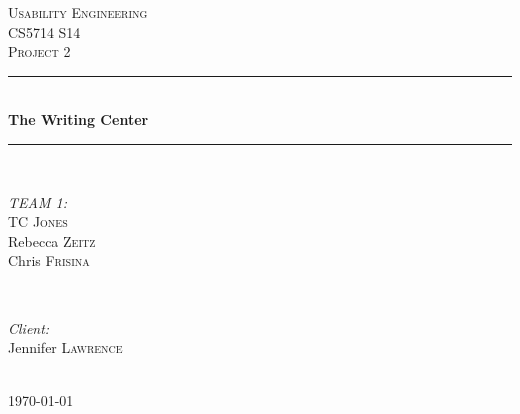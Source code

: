 \documentclass[12pt]{article} %
\begin{document}

\begin{titlepage}

\newcommand{\HRule}{\rule{\linewidth}{0.5mm}} %

\center %

\textsc{\LARGE Usability Engineering}\\[1.5cm] %
\textsc{\Large CS5714 S14}\\[0.5cm] %
\textsc{\large Project 2}\\[0.5cm] %

\HRule \\[0.4cm]
{ \huge \bfseries The Writing Center }\\[0.4cm] %
\HRule \\[1.5cm]

\begin{minipage}{0.4\textwidth}
\begin{flushleft} \large
\emph{TEAM 1:}\\
TC \textsc{Jones}\\ %
Rebecca \textsc{Zeitz}\\ %
Chris \textsc{Frisina} %
\end{flushleft}
\end{minipage}
~
\begin{minipage}{0.4\textwidth}
\begin{flushright} \large
\emph{Client:} \\
Jennifer \textsc{Lawrence} %
\end{flushright}
\end{minipage}\\[4cm]

{\large \today}\\[3cm] %


\vfill %

\end{titlepage}
\end{document}
